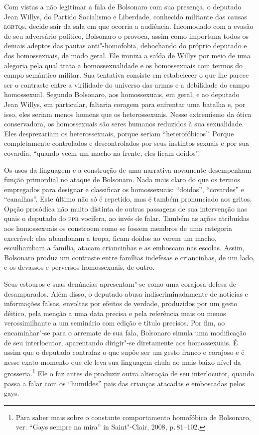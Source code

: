 Com vistas a não legitimar a fala de Bolsonaro com sua presença, o
deputado Jean Willys, do Partido Socialismo e Liberdade, conhecido
militante das causas \textsc{lgbtq}s, decide sair da sala em que ocorria a
audiência. Incomodado com a evasão de seu adversário político, Bolsonaro
o provoca, assim como importuna todos os demais adeptos das pautas
anti"-homofobia, debochando do próprio deputado e dos homossexuais, de
modo geral. Ele ironiza a saída de Willys por meio de uma alegoria pela
qual trata a homossexualidade e os homossexuais com termos do campo
semântico militar. Sua tentativa consiste em estabelecer o que lhe
parece ser o contraste entre a virilidade do universo das armas e a
debilidade do campo homossexual. Segundo Bolsonaro, aos homossexuais, em
geral, e ao deputado Jean Willys, em particular, faltaria coragem para
enfrentar uma batalha e, por isso, eles seriam menos homens que os
heterossexuais. Nesse extremismo da ótica conservadora, os homossexuais
são seres humanos reduzidos à sua sexualidade. Eles desprezariam os
heterossexuais, porque seriam ``heterofóbicos''. Porque completamente
controlados e descontrolados por seus instintos sexuais e por sua
covardia, ``quando veem um macho na frente, eles ficam doidos''.

Os usos da linguagem e a construção de uma narrativa novamente
desempenham função primordial no ataque de Bolsonaro. Nada mais claro do
que os termos empregados para designar e classificar os homossexuais:
``doidos'', ``covardes'' e ``canalhas''. Este último não só é repetido,
mas é também pronunciado aos gritos. Opção prosódica não muito distinta
de outras passagens de sua intervenção nas quais o deputado do \textsc{ppr}
vocifera, ao invés de falar. Também as ações atribuídas aos homossexuais
os constroem como se fossem membros de uma categoria execrável: eles
abandonam a tropa, ficam doidos ao verem um macho, esculhambam a
família, atacam criancinhas e as emboscam nas escolas. Assim, Bolsonaro
produz um contraste entre famílias indefesas e criancinhas, de um lado,
e os devassos e perversos homossexuais, de outro.

Seus estouros e suas denúncias apresentam"-se como uma corajosa defesa de
desamparados. Além disso, o deputado abusa indiscriminadamente de
notícias e informações falsas, envoltas por efeitos de verdade,
produzidos por um gesto dêitico, pela menção a uma data precisa e pela
referência mais ou menos verossimilhante a um seminário com edição e
título precisos. Por fim, ao encaminhar"-se para o arremate de sua fala,
Bolsonaro simula uma modificação de seu interlocutor, aparentando
dirigir"-se diretamente aos homossexuais. É assim que o deputado
contrafaz o que supõe ser um gesto franco e corajoso e é nesse exato
momento que ele leva sua linguagem chula ao mais baixo nível da
grosseria.\footnote{Para saber mais sobre o constante comportamento
  homofóbico de Bolsonaro, ver: ``Gays sempre na mira'' in Saint"-Clair,
  2008, p.\,81--102.} Ele o faz antes de produzir outra alteração de seu
interlocutor, quando passa a falar com os ``humildes'' pais das crianças
atacadas e emboscadas pelos gays.

